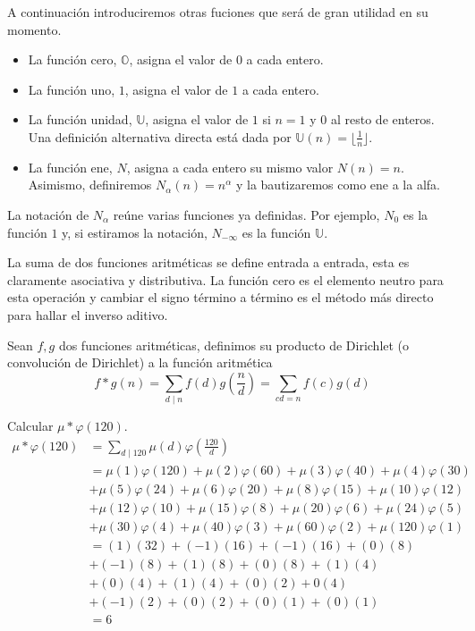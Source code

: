 \documentclass[main.tex]{subfiles}
\begin{document}
A continuaci\'on introduciremos otras fuciones que ser\'a de gran utilidad en su momento.
\begin{itemize}
    \item La funci\'on cero, $\mathbb O$, asigna el valor de $0$ a cada entero.
    \item La funci\'on uno, $1$, asigna el valor de $1$ a cada entero.
    \item La funci\'on unidad, $\mathbb U$, asigna el valor de $1$ si $n = 1$ y $0$ al resto de enteros. Una definici\'on alternativa directa est\'a dada por $\mathbb U(n) = \lfloor\frac{1}{n}\rfloor$.
    \item La funci\'on ene, $N$, asigna a cada entero su mismo valor $N(n) = n$. Asimismo, definiremos $N_\alpha(n) = n^{\alpha}$ y la bautizaremos como ene a la alfa.
\end{itemize}
\begin{remark}
La notaci\'on de $N_\alpha$ re\'une varias funciones ya definidas. Por ejemplo, $N_0$ es la funci\'on $1$ y, si estiramos la notaci\'on, $N_{-\infty}$ es la funci\'on $\mathbb U$.
\end{remark}
La suma de dos funciones aritm\'eticas se define entrada a entrada, esta es claramente asociativa y distributiva. La funci\'on cero es el elemento neutro para esta operaci\'on y cambiar el signo t\'ermino a t\'ermino es el m\'etodo m\'as directo para hallar el inverso aditivo.
\begin{defn}
Sean $f, g$ dos funciones aritm\'eticas, definimos su producto de Dirichlet (o convoluci\'on de Dirichlet) a la funci\'on aritm\'etica
$$f*g(n) = \sum_{d \mid n} f(d)g(\frac{n}{d}) = \sum_{cd = n} f(c)g(d)$$
\end{defn}
\begin{example}
Calcular $\mu*\varphi(120)$.
\begin{align*}
    \mu*\varphi(120) &= \sum_{d \mid 120}\mu(d)\varphi(\frac{120}{d})\\
    &= \mu(1)\varphi(120) + \mu(2)\varphi(60) + \mu(3)\varphi(40) + \mu(4)\varphi(30)\\
    &+ \mu(5)\varphi(24) + \mu(6)\varphi(20) + \mu(8)\varphi(15) + \mu(10)\varphi(12)\\
    &+ \mu(12)\varphi(10) + \mu(15)\varphi(8) + \mu(20)\varphi(6) + \mu(24)\varphi(5)\\
    &+ \mu(30)\varphi(4) + \mu(40)\varphi(3) + \mu(60)\varphi(2) + \mu(120)\varphi(1)\\
    &= (1)(32) + (-1)(16) + (-1)(16) + (0)(8)\\
    &+ (-1)(8) + (1)(8) + (0)(8) + (1)(4)\\
    &+ (0)(4) + (1)(4) + (0)(2) + 0(4)\\
    &+ (-1)(2) + (0)(2) + (0)(1) + (0)(1)\\
    &= 6
\end{align*}
\end{example}
\end{document}
